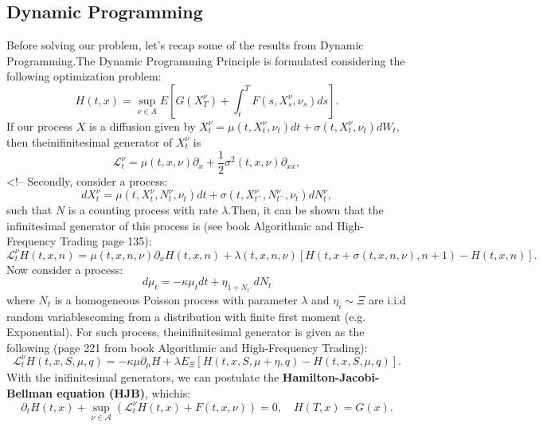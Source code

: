 \subsection{Dynamic Programming}
Before solving our problem, let's recap some of the results from Dynamic Programming.The Dynamic Programming Principle is formulated considering the following optimization problem:
\begin{displaymath}
	H(t,x) = \sup_{\nu \in A} E \left[
	G(X^\nu_T) + \int^T_t F(s,X^\nu_s, \nu_s) ds
	\right].
\end{displaymath}
If our process $X$ is a diffusion given by $X_t^\nu = \mu(t,X^\nu_t, \nu_t) dt  + \sigma(t,X^\nu_t, \nu_t) dW_t$, then theinifinitesimal generator of $X^\nu_t$ is
\begin{displaymath}
	\mathcal L^\nu_t = \mu(t,x,\nu) \partial_x + \frac{1}{2}\sigma^2(t,x,\nu) \partial_{xx},
\end{displaymath}
<!-- Secondly, consider a process:
\begin{displaymath}
	dX^\nu_t = \mu (t, X^\nu_t, N_t^\nu, \nu_t) dt + \sigma(t, X^\nu_{t^-},N^\nu_{t^-}, \nu_t) d N_t^\nu,
\end{displaymath}
such that $N$ is a counting process with rate $\lambda$.Then, it can be shown that the infinitesimal generator of this process is (see book Algorithmic and High-Frequency Trading page 135):
\begin{displaymath}
	\mathcal L^\nu_t H(t,x,n) = \mu(t,x,n,\nu)\partial_x H(t,x,n) + \lambda(t,x,n,\nu)[H(t,x+\sigma(t,x,n,\nu),n+1) - H(t,x,n)].
\end{displaymath}
Now consider a process:
\begin{displaymath}
	d\mu_t = -\kappa \mu_t dt + \eta_{1+N_{t^-}} dN_t
\end{displaymath}
where $N_t$ is a homogeneous Poisson process with parameter $\lambda$ and $\eta_i \sim \Xi$ are i.i.d random variablescoming from a distribution with finite first moment (e.g. Exponential). For such process, theinifinitesimal generator is given as the following (page 221 from book Algorithmic and High-Frequency Trading):
\begin{displaymath}
	\mathcal L^\nu_t H(t,x,S,\mu,q) = -\kappa \mu\partial_\mu H + \lambda E_\Xi[H(t,x, S, \mu+\eta,q) - H(t,x,S,\mu,q)].
\end{displaymath}
With the inifinitesimal generators, we can postulate the \textbf{Hamilton-Jacobi-Bellman equation (HJB)}, whichis:
\begin{displaymath}
	\partial_t H(t,x) +  \sup_{\nu \in \mathcal A}(\mathcal L^\nu_t H(t,x) + F(t,x,\nu)) = 0, \quad H(T,x) = G(x).
\end{displaymath}

